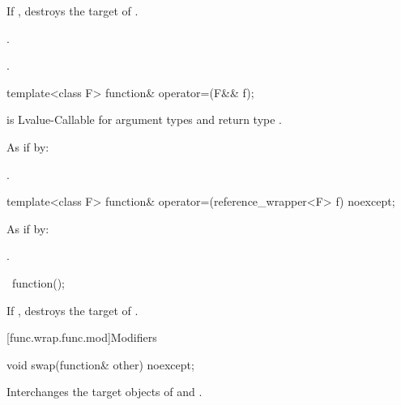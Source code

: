 \begin{itemdescr}
\pnum
\effects
If , destroys the target of .

\pnum
\ensures
{}.

\pnum
\returns
{}.
\end{itemdescr}

%
\begin{itemdecl}
template<class F> function& operator=(F&& f);
\end{itemdecl}

\begin{itemdescr}
\pnum
\constraints
{} is Lvalue-Callable
for argument types  and return type .

\pnum
\effects
As if by: 

\pnum
\returns
{}.
\end{itemdescr}

%
\begin{itemdecl}
template<class F> function& operator=(reference_wrapper<F> f) noexcept;
\end{itemdecl}

\begin{itemdescr}
\pnum
\effects
As if by: 

\pnum
\returns
{}.
\end{itemdescr}

%
\begin{itemdecl}
~function();
\end{itemdecl}

\begin{itemdescr}
\pnum
\effects
If , destroys the target of .
\end{itemdescr}

[func.wrap.func.mod]{Modifiers}

%
\begin{itemdecl}
void swap(function& other) noexcept;
\end{itemdecl}

\begin{itemdescr}
\pnum
\effects
Interchanges the target objects of  and .
\end{itemdescr}


